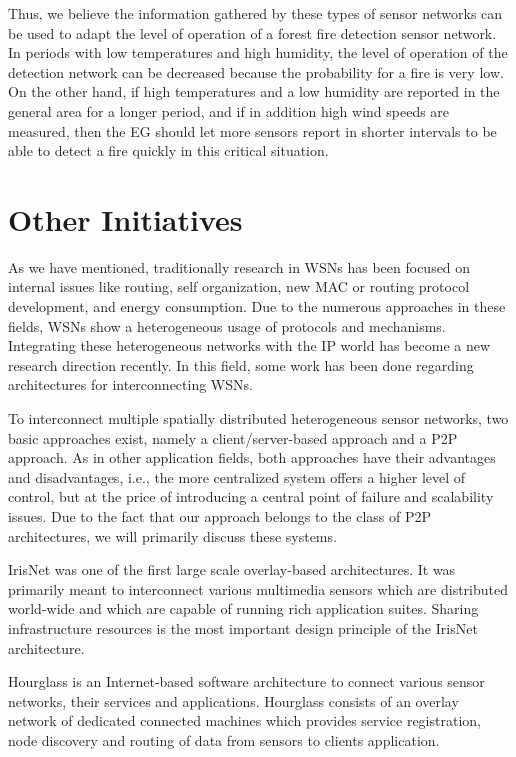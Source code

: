 \documentclass[onecolumn]{jaise2e}
\begin{document}
Thus, we believe the information gathered by these types of sensor networks can be used to adapt the level of operation of a forest fire detection sensor network. In periods with low temperatures and high humidity, the level of operation of the detection network can be decreased because the probability for a fire is very low. On the other hand, if high temperatures and a low humidity are reported in the general area for a longer period, and if in addition high wind speeds are measured, then the EG should let more sensors report in shorter intervals to be able to detect a fire quickly in this critical situation.




\section{Other Initiatives}\label{sec:relwork}

As we have mentioned, traditionally research in WSNs has been focused on internal issues like routing, self organization, new MAC or routing protocol development, and energy consumption. Due to the numerous approaches in these fields, WSNs show a heterogeneous usage of protocols and mechanisms. Integrating these heterogeneous networks with the IP world has become a new research direction recently. In this field, some work has been done regarding architectures for interconnecting WSNs. 

To interconnect multiple spatially distributed heterogeneous sensor networks, two basic approaches exist, namely a client/server-based approach and a P2P approach. As in other application fields, both approaches have their advantages and disadvantages, i.e., the more centralized system offers a higher level of control, but at the price of introducing a central point of failure and scalability issues. Due to the fact that our approach belongs to the class of P2P architectures, we will primarily discuss these systems.

IrisNet \cite{ref-journal2} was one of the first large scale overlay-based architectures. It was primarily meant to interconnect various multimedia sensors which are distributed world-wide and which are capable of running rich application suites. Sharing infrastructure resources is the most important design principle of the IrisNet architecture. 

Hourglass \cite{ref-journal3} is an Internet-based software architecture to connect various sensor networks, their services and applications. Hourglass consists of an overlay network of dedicated connected machines which provides service registration, node discovery and routing of data from sensors to clients application. 
\end{document}
